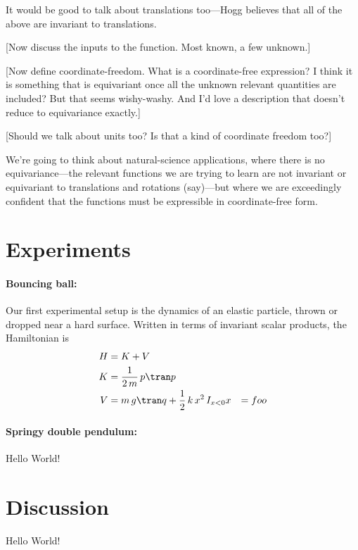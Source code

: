 \documentclass[12pt]{article}
\begin{document}
It would be good to talk about translations too---Hogg believes that all of the above are invariant to translations.

[Now discuss the inputs to the function. Most known, a few unknown.]

[Now define coordinate-freedom. What is a coordinate-free expression? I think it is something that is equivariant once all the unknown relevant quantities are included? But that seems wishy-washy. And I'd love a description that doesn't reduce to equivariance exactly.]

[Should we talk about units too? Is that a kind of coordinate freedom too?]

We're going to think about natural-science applications, where there is no equivariance---the relevant functions we are trying to learn are not invariant or equivariant to translations and rotations (say)---but where we are exceedingly confident that the functions must be expressible in coordinate-free form.

\section{Experiments}

\paragraph{Bouncing ball:}
Our first experimental setup is the dynamics of an elastic particle, thrown or dropped near a hard surface.
Written in terms of invariant scalar products, the Hamiltonian is
\begin{align}
    H &= K + V \\
    K &= \frac{1}{2\,m}\,p\tran p \\
    V &= m\,g\tran q + \frac{1}{2}\,k\,x^2\,I_{x < 0}
    x &= foo
\end{align}

\paragraph{Springy double pendulum:}
Hello World!

\section{Discussion}

Hello World!
\end{document}
